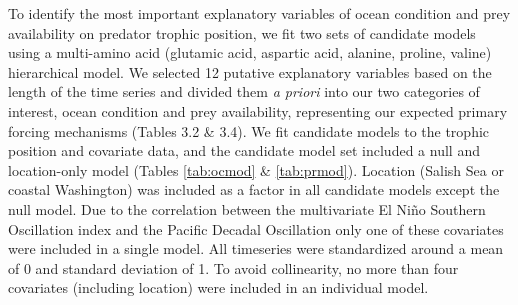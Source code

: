\documentclass [11pt, proquest] {uwthesis}[2015/03/03]
\begin{document}
To identify the most important explanatory variables of ocean condition
and prey availability on predator trophic position, we fit two sets of
candidate models using a multi-amino acid (glutamic acid, aspartic acid,
alanine, proline, valine) hierarchical model. We selected 12 putative
explanatory variables based on the length of the time series and divided
them \emph{a priori} into our two categories of interest, ocean
condition and prey availability, representing our expected primary
forcing mechanisms (Tables 3.2 \& 3.4). We fit candidate models to the
trophic position and covariate data, and the candidate model set
included a null and location-only model (Tables \ref{tab:ocmod} \&
\ref{tab:prmod}). Location (Salish Sea or coastal Washington) was
included as a factor in all candidate models except the null model. Due
to the correlation between the multivariate El Niño Southern Oscillation
index and the Pacific Decadal Oscillation only one of these covariates
were included in a single model. All timeseries were standardized around
a mean of 0 and standard deviation of 1. To avoid collinearity, no more
than four covariates (including location) were included in an individual
model.
\end{document}
